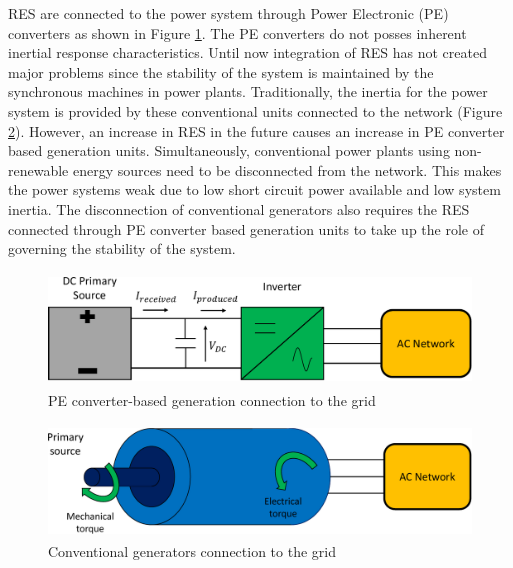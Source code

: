 \gls{RES} are connected to the power system through Power Electronic (\gls{PE}) converters as shown in Figure \ref{fig:Energy_conv_system_2}. The \gls{PE} converters do not posses inherent inertial response characteristics. Until now integration of \gls{RES} has not created major problems since the stability of the system is maintained by the synchronous machines in power plants. Traditionally, the inertia for the power system is provided by these conventional units connected to the network (Figure \ref{fig:Energy_conv_system}). However, an increase in \gls{RES} in the future causes an increase in \gls{PE} converter based generation units. Simultaneously, conventional power plants using non-renewable energy sources need to be disconnected from the network. This makes the power systems weak due to low short circuit power available and low system inertia. The disconnection of conventional generators also requires the \gls{RES} connected through \gls{PE} converter based generation units to take up the role of governing the stability of the system.

\begin{figure}[H]
\centering
    \includegraphics[height = 3cm,width = 12cm]{Diagrams/Chapter_1/Energy_conv_system_2.pdf}
    \caption{PE converter-based generation connection to the grid \cite{denis_migrate_2018}}
    \label{fig:Energy_conv_system_2}
\end{figure}
\vspace{0mm}
\begin{figure}[H]
\centering
    \includegraphics[height = 3cm,width = 12.5cm]{Diagrams/Chapter_1/Energy_conv_system.pdf}
    \caption{Conventional generators connection to the grid \cite{denis_migrate_2018}}
    \label{fig:Energy_conv_system}
\end{figure}

